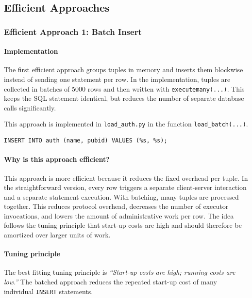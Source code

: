 \documentclass[11pt]{scrartcl}
\begin{document}
\subsection*{Efficient Approaches}

\subsubsection*{Efficient Approach 1: Batch Insert}

\paragraph{Implementation}

The first efficient approach groups tuples in memory and inserts them blockwise instead of sending one statement per row. In the implementation, tuples are collected in batches of 5000 rows and then written with \texttt{executemany(...)}. This keeps the SQL statement identical, but reduces the number of separate database calls significantly.

This approach is implemented in \texttt{load\_auth.py} in the function \texttt{load\_batch(...)}.

\begin{lstlisting}[style=dbtsql]
INSERT INTO auth (name, pubid) VALUES (%s, %s);
\end{lstlisting}

\paragraph{Why is this approach efficient?}

This approach is more efficient because it reduces the fixed overhead per tuple. In the straightforward version, every row triggers a separate client-server interaction and a separate statement execution. With batching, many tuples are processed together. This reduces protocol overhead, decreases the number of executor invocations, and lowers the amount of administrative work per row. The idea follows the tuning principle that start-up costs are high and should therefore be amortized over larger units of work.

\paragraph{Tuning principle}

The best fitting tuning principle is \emph{``Start-up costs are high; running costs are low.''} The batched approach reduces the repeated start-up cost of many individual \texttt{INSERT} statements.
\end{document}
